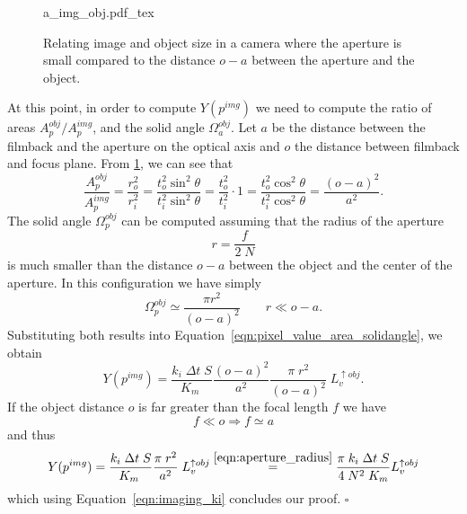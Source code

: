 \begin{figure}[t]
    \centering
    \def\svgwidth{0.9\linewidth}
    {a_img_obj.pdf_tex} 
    \caption{\label{fig:aperture_distance}%
        Relating image and object size in a camera where the aperture is small compared to the distance
        $o-a$ between the aperture and the object.}
\end{figure}

At this point, in order to compute $Y(p^{img})$ we need to compute the ratio of
areas $A_p^{obj}/A_p^{img}$, and the solid angle $\Omega_a^{obj}$. Let $a$ be the distance between the filmback and the
aperture on the optical axis and $o$ the distance between filmback and focus
plane. From \cref{fig:aperture_distance}, we can see that
\begin{equation*}
    \frac{A_p^{obj}}{A^{img}_p}
    = \frac{r_o^2}{r_i^2}
    = \frac{t_o^2 \sin^2\theta}{t_i^2 \sin^2\theta}
    = \frac{t_o^2}{t_i^2} \cdot 1
    = \frac{t_o^2 \cos^2\theta}{t_i^2 \cos^2\theta}
    = \frac{(o-a)^2}{a^2}.
\end{equation*}
The solid angle $\Omega_p^{obj}$ can be computed assuming that the radius of the
aperture 
\begin{equation}\label{eqn:aperture_radius}
    r = \frac{f}{2\;N}
\end{equation}
is much smaller than the distance $o-a$ between the object
and the center of the aperture. In this configuration we have simply
\begin{equation}\label{eqn:imaging_omegapobj}
\Omega_p^{obj} \simeq \frac{\pi r^2}{(o-a)^2} \qquad r \ll o-a.
\end{equation}
Substituting both results into Equation~\eqref{eqn:pixel_value_area_solidangle}, we obtain
\begin{equation}\label{eqn:imaging_y2}
Y(p^{img}) =  \frac{k_i\; \Delta t \; S}{K_m\;} \frac{(o-a)^2}{a^2} \frac{\pi\;r^2}{(o-a)^2}\; L_v^{\uparrow obj}.
\end{equation}
If the object distance $o$ is far greater than the focal length $f$ we have
\begin{equation}
f \ll o \Rightarrow  f \simeq a
\end{equation}
and thus
\begin{equation}
  Y(p^{img}) =  \frac{k_i\; \Delta t \; S}{K_m\;} \frac{\pi\;r^2}{a^2}\; L_v^{\uparrow obj} \stackrel{\eqref{eqn:aperture_radius}}{=}
   \frac{\pi\; k_i\; \Delta t \; S}{4\;N^2\;K_m} L_v^{\uparrow obj} 
\end{equation}
which using Equation~\eqref{eqn:imaging_ki} concludes our proof. \hfill $\square$

